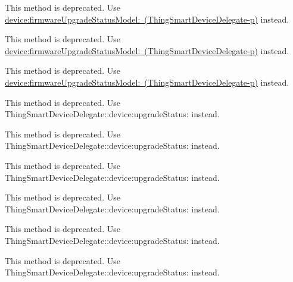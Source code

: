 \begin{DoxyRefList}
\label{deprecated__deprecated000139}%
%
This method is deprecated. Use \mbox{\hyperlink{protocol_thing_smart_device_delegate-p_a7e5c951797795775b302cf8ac688bceb}{device\+:firmware\+Upgrade\+Status\+Model\+: (\+Thing\+Smart\+Device\+Delegate-\/p)}} instead. 

\label{deprecated__deprecated000133}%
%
This method is deprecated. Use \mbox{\hyperlink{protocol_thing_smart_device_delegate-p_a7e5c951797795775b302cf8ac688bceb}{device\+:firmware\+Upgrade\+Status\+Model\+: (\+Thing\+Smart\+Device\+Delegate-\/p)}} instead. 

\label{deprecated__deprecated000151}%
%
This method is deprecated. Use \mbox{\hyperlink{protocol_thing_smart_device_delegate-p_a7e5c951797795775b302cf8ac688bceb}{device\+:firmware\+Upgrade\+Status\+Model\+: (\+Thing\+Smart\+Device\+Delegate-\/p)}} instead.  
\item[Member \mbox{\hyperlink{protocol_thing_smart_device_delegate-p_ad08583d6ecc97bab88acaf2063243de1}{\mbox{[}Thing\+Smart\+Device\+Delegate-\/p device\+Firmware\+Upgrade\+Failure\+:type\+:\mbox{]}}} ]\label{deprecated__deprecated000135}%
%
This method is deprecated. Use Thing\+Smart\+Device\+Delegate\+::device\+:upgrade\+Status\+: instead. 

\label{deprecated__deprecated000153}%
%
This method is deprecated. Use Thing\+Smart\+Device\+Delegate\+::device\+:upgrade\+Status\+: instead. 

\label{deprecated__deprecated000141}%
%
This method is deprecated. Use Thing\+Smart\+Device\+Delegate\+::device\+:upgrade\+Status\+: instead. 

\label{deprecated__deprecated000147}%
%
This method is deprecated. Use Thing\+Smart\+Device\+Delegate\+::device\+:upgrade\+Status\+: instead.  
\item[Member \mbox{\hyperlink{protocol_thing_smart_device_delegate-p_ad3f43dad293f5a54d79f51509d46b7ba}{\mbox{[}Thing\+Smart\+Device\+Delegate-\/p device\+Firmware\+Upgrade\+Success\+:type\+:\mbox{]}}} ]\label{deprecated__deprecated000146}%
%
This method is deprecated. Use Thing\+Smart\+Device\+Delegate\+::device\+:upgrade\+Status\+: instead. 

\label{deprecated__deprecated000134}%
%
This method is deprecated. Use Thing\+Smart\+Device\+Delegate\+::device\+:upgrade\+Status\+: instead. 


\end{DoxyRefList}
